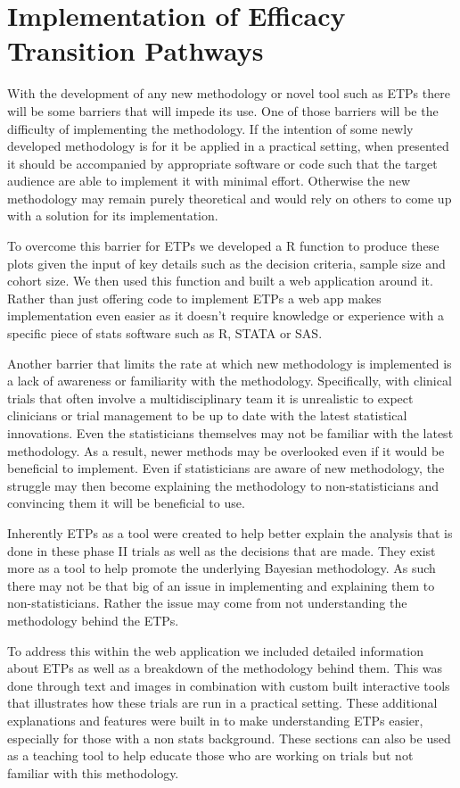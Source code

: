 \section{Implementation of Efficacy Transition Pathways}

With the development of any new methodology or novel tool such as ETPs there will be some barriers that will impede its use. One of those barriers will be the difficulty of implementing the methodology. If the intention of some newly developed methodology is for it be applied in a practical setting, when presented it should be accompanied by appropriate software or code such that the target audience are able to implement it with minimal effort. Otherwise the new methodology may remain purely theoretical and would rely on others to come up with a solution for its implementation. 

To overcome this barrier for ETPs we developed a R function to produce these plots given the input of key details such as the decision criteria, sample size and cohort size. We then used this function and built a web application around it. Rather than just offering code to implement ETPs a web app makes implementation even easier as it doesn't require knowledge or experience with a specific piece of stats software such as R, STATA or SAS. 

Another barrier that limits the rate at which new methodology is implemented is a lack of awareness or familiarity with the methodology. Specifically, with clinical trials that often involve a multidisciplinary team it is unrealistic to expect clinicians or trial management to be up to date with the latest statistical innovations. Even the statisticians themselves may not be familiar with the latest methodology. As a result, newer methods may be overlooked even if it would be beneficial to implement. Even if statisticians are aware of new methodology, the struggle may then become explaining the methodology to non-statisticians and convincing them it will be beneficial to use. 

Inherently ETPs as a tool were created to help better explain the analysis that is done in these phase \RN{2} trials as well as the decisions that are made. They exist more as a tool to help promote the underlying Bayesian methodology. As such there may not be that big of an issue in implementing and explaining them to non-statisticians. Rather the issue may come from not understanding the methodology behind the ETPs. 

To address this within the web application we included detailed information about ETPs as well as a breakdown of the methodology behind them. This was done through text and images in combination with custom built interactive tools that illustrates how these trials are run in a practical setting. These additional explanations and features were built in to make understanding ETPs easier, especially for those with a non stats background. These sections can also be used as a teaching tool to help educate those who are working on trials but not familiar with this methodology.  
 
